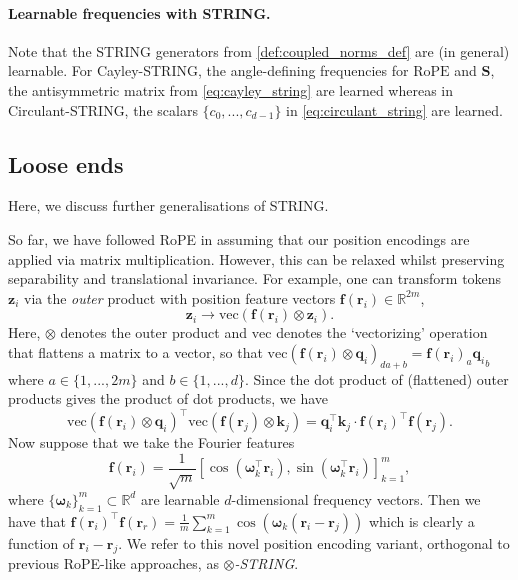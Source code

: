 \vspace{-3mm}
\paragraph{Learnable frequencies with STRING.} Note that the STRING generators from \cref{def:coupled_norms_def} are (in general) learnable. %
For Cayley-STRING, the angle-defining frequencies for $\textrm{RoPE}$ and $\mathbf{S}$, the antisymmetric matrix from \cref{eq:cayley_string} are learned whereas in Circulant-STRING, the scalars $\{c_0,...,c_{d-1} \}$ in \cref{eq:circulant_string} are learned. %
\vspace{-3mm}
\subsection{Loose ends}
Here, we discuss further generalisations of STRING. 




So far, we have followed RoPE in assuming that our position encodings are applied via matrix multiplication. 
However, this can be relaxed whilst preserving separability and translational invariance. 
For example, one can transform tokens $\mathbf{z}_i$ via the \emph{outer} product with position feature vectors $\mathbf{f}(\mathbf{r}_i) \in \mathbb{R}^{2m}$,
\begin{equation}
    \mathbf{z}_i \to \textrm{vec}(\mathbf{f}(\mathbf{r}_i) \otimes \mathbf{z}_i).
\end{equation}
Here, $\otimes$ denotes the outer product and $\textrm{vec}$ denotes the `vectorizing' operation that flattens a matrix to a vector, so that
$\textrm{vec}(\mathbf{f}(\boldsymbol{r}_i) \otimes \mathbf{q}_i)_{da+b} =\mathbf{f}(\boldsymbol{r}_i)_a {\mathbf{q}_i}_b$ where $a \in \{1,...,2m\}$ and $b \in \{1,...,d\}$.
Since the dot product of (flattened) outer products gives the product of dot products, we have
\begin{equation}
    \textrm{vec}(\mathbf{f}(\mathbf{r}_i) \otimes \mathbf{q}_i)^\top \textrm{vec}(\mathbf{f}(\mathbf{r}_j) \otimes \mathbf{k}_j) = \mathbf{q}_i^\top\mathbf{k}_j \cdot \mathbf{f}(\mathbf{r}_i)^\top \mathbf{f}(\mathbf{r}_j).
\end{equation}
Now suppose that we take the Fourier features 
\begin{equation}
    \mathbf{f}(\mathbf{r}_i) = \frac{1}{\sqrt{m}}\left[\cos(\boldsymbol{\omega}_k^\top \mathbf{r}_i),\sin(\boldsymbol{\omega}_k^\top \mathbf{r}_i) \right]_{k=1}^m, 
\end{equation}
where $\{ \boldsymbol{\omega}_k \}_{k=1}^m \subset \mathbb{R}^d$ are learnable $d$-dimensional frequency vectors.
Then we have that $\mathbf{f}(\mathbf{r}_i)^\top \mathbf{f}(\mathbf{r}_r) = \frac{1}{m} \sum_{k=1}^m \cos (\boldsymbol{\omega}_k(\mathbf{r}_i - \mathbf{r}_j))$ which is clearly a function of $\mathbf{r}_i - \mathbf{r}_j$.
We refer to this novel position encoding variant, orthogonal to previous RoPE-like approaches, as \emph{$\otimes$-STRING}. 

